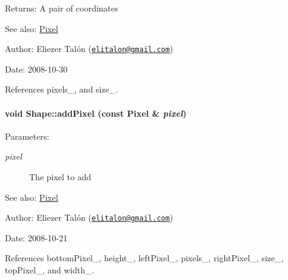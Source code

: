 \begin{Desc}
\item[Returns:]A pair of coordinates\end{Desc}
\begin{Desc}
\item[See also:]\hyperlink{_pixel_8hpp_535e59456e3e633842529cfa8ea103c4}{Pixel}\end{Desc}
\begin{Desc}
\item[Author:]Eliezer Talón (\href{mailto:elitalon@gmail.com}{\tt elitalon@gmail.com}) \end{Desc}
\begin{Desc}
\item[Date:]2008-10-30 \end{Desc}


References pixels\_\-, and size\_\-.\hypertarget{class_shape_f6114234203d9473f1fef9e6391f9243}{
\paragraph[addPixel]{\setlength{\rightskip}{0pt plus 5cm}void Shape::addPixel (const {\bf Pixel} \& {\em pixel})}\hfill}
\label{class_shape_f6114234203d9473f1fef9e6391f9243}


\begin{Desc}
\item[Parameters:]
\begin{description}
\item[{\em pixel}]The pixel to add\end{description}
\end{Desc}
\begin{Desc}
\item[See also:]\hyperlink{_pixel_8hpp_535e59456e3e633842529cfa8ea103c4}{Pixel}\end{Desc}
\begin{Desc}
\item[Author:]Eliezer Talón (\href{mailto:elitalon@gmail.com}{\tt elitalon@gmail.com}) \end{Desc}
\begin{Desc}
\item[Date:]2008-10-21 \end{Desc}


References bottomPixel\_\-, height\_\-, leftPixel\_\-, pixels\_\-, rightPixel\_\-, size\_\-, topPixel\_\-, and width\_\-.